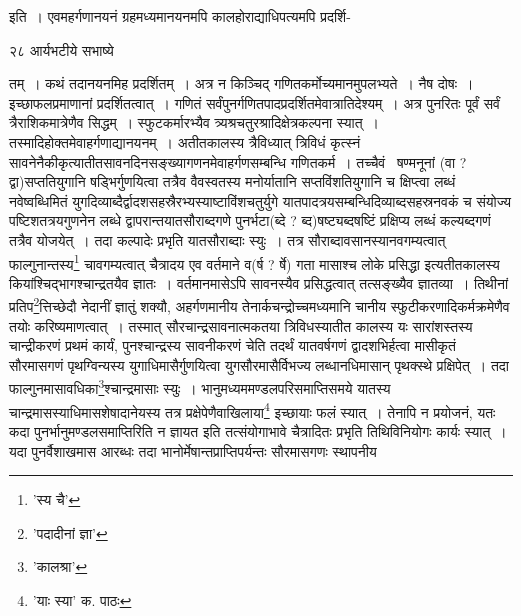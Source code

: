\documentclass[11pt, openany]{book}
\begin{document}
{\noindent इति~। एवमहर्गणानयनं ग्रहमध्यमानयनमपि कालहोराद्याधिपत्यमपि प्रदर्शि-

\newpage

\vspace{3cm} २८ \hspace{4cm}आर्यभटीये सभाष्ये 

\vspace{0.3cm}
\noindent तम्~। कथं तदानयनमिह प्रदर्शितम्~। अत्र न किञ्चिद् गणितकर्मोच्यमानमुपलभ्यते~। नैष दोषः~। इच्छाफलप्रमाणानां प्रदर्शितत्वात्~। गणितं सर्वंपुनर्गणितपादप्रदर्शितमेवात्रातिदेश्यम्~। अत्र पुनरितः पूर्वं सर्वं त्रैराशिकमात्रेणैव सिद्धम्~। स्फुटकर्मारभ्यैव त्र्यश्रचतुरश्रादिक्षेत्रकल्पना स्यात्~। तस्मादिहोक्तमेवाहर्गणाद्यानयनम्~। अतीतकालस्य त्रैविध्यात् त्रिविधं कृत्स्नं सावनेनैकीकृत्यातीतसावनदिनसङ्ख्यागणनमेवाहर्गणसम्बन्धि गणितकर्म~। तच्चैवं \textendash\ षण्मनूनां (वा ? द्वा)सप्ततियुगानि षड्भिर्गुणयित्वा तत्रैव वैवस्वतस्य मनोर्यातानि सप्तविंशतियुगानि च क्षिप्त्वा लब्धं नवेष्वब्धिमितं युगदिव्याब्दैर्द्वादशसहस्रैरभ्यस्याष्टाविंशचतुर्युगे
यातपादत्रयसम्बन्धिदिव्याब्दसहस्रनवकं च संयोज्य पष्टिशतत्रयगुणनेन लब्धे द्वापरान्तयातसौराब्दगणे पुनर्भटा(ब्दे ? ब्द)षष्ट्यब्दषष्टिं प्रक्षिप्य लब्धं
कल्यब्दगणं तत्रैव योजयेत्~। तदा कल्पादेः प्रभृति यातसौराब्दाः स्युः~। तत्र सौराब्दावसानस्यानवगम्यत्वात् फाल्गुनान्तस्य\renewcommand{\thefootnote}{१}\footnote{'स्य चै'} चावगम्यत्वात् चैत्रादय एव वर्तमाने व(र्ष ? र्षे) गता मासाश्च लोके प्रसिद्धा इत्यतीतकालस्य कियांश्चिद्भागश्चान्द्रतयैव ज्ञातः~। वर्तमानमासेऽपि सावनस्यैव प्रसिद्धत्वात् तत्सङ्ख्यैव ज्ञातव्या~। तिथीनां प्रतिप\renewcommand{\thefootnote}{२}\footnote{'पदादीनां ज्ञा'}त्तिच्छेदौ नेदानीं ज्ञातुं शक्यौ, अहर्गणमानीय तेनार्कचन्द्रोच्चमध्यमानि चानीय स्फुटीकरणादिकर्मक्रमेणैव तयोः करिष्यमाणत्वात्~। तस्मात् सौरचान्द्रसावनात्मकतया त्रिविधस्यातीत कालस्य यः सारांशस्तस्य चान्द्रीकरणं प्रथमं कार्यं, पुनश्चान्द्रस्य सावनीकरणं चेति तदर्थं यातवर्षगणं द्वादशभिर्हत्वा मासीकृतं सौरमासगणं पृथग्विन्यस्य युगाधिमासैर्गुणयित्वा युगसौरमासैर्विभज्य लब्धानधिमासान् पृथक्स्थे प्रक्षिपेत्~। तदा फाल्गुनमासावधिका\renewcommand{\thefootnote}{३}\footnote{'कालश्रा'}श्चान्द्रमासाः स्युः~। भानुमध्यममण्डलपरिसमाप्तिसमये यातस्य चान्द्रमासस्याधिमासशेषादानेयस्य तत्र प्रक्षेपेणैवाखिलाया\renewcommand{\thefootnote}{४}\footnote{'याः स्या' क. पाठः} इच्छायाः फलं स्यात्~। तेनापि न प्रयोजनं, यतः कदा पुनर्भानुमण्डलसमाप्तिरिति न ज्ञायत इति तत्संयोगाभावे चैत्रादितः प्रभृति तिथिविनियोगः कार्यः स्यात्~। यदा पुनर्वैशाखमास आरब्धः तदा भानोर्मेषान्तप्राप्तिपर्यन्तः सौरमासगणः स्थापनीय

\newpage

}
\end{document}
